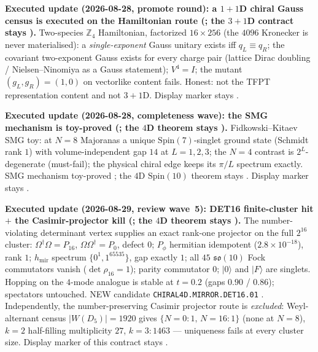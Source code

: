 \par\smallskip\noindent\textbf{Executed update (2026-08-28, promote round): a $1{+}1$D chiral
Gauss census is executed on the Hamiltonian route
(; the $3{+}1$D
contract stays \mO).}
Two-species $\mathbb Z_4$ Hamiltonian, factorized $16\times256$ (the $4096$ Kronecker is never
materialised): a \emph{single-exponent} Gauss unitary exists iff $q_L\equiv q_R$; the covariant
two-exponent Gauss exists for every charge pair (lattice Dirac doubling / Nielsen--Ninomiya as
a Gauss statement); $V^4=I$; the mutant $(g_L,g_R)=(1,0)$ on vectorlike content fails.
Honest: not the TFPT representation content and not $3{+}1$D.  Display marker stays \mO.

\par\smallskip\noindent\textbf{Executed update (2026-08-28, completeness wave): the SMG mechanism
is toy-proved
(; the $4$D theorem stays \mO).}
Fidkowski--Kitaev SMG toy: at $N=8$ Majoranas a unique $\mathrm{Spin}(7)$-singlet ground state
(Schmidt rank $1$) with volume-independent gap $14$ at $L=1,2,3$; the $N=4$ contrast is
$2^L$-degenerate (must-fail); the physical chiral edge keeps its $\pi/L$ spectrum exactly.
SMG mechanism toy-proved \mE; the $4$D $\mathrm{Spin}(10)$ theorem stays \mO.
Display marker stays \mO.

\par\smallskip\noindent\textbf{Executed update (2026-08-29, review wave~5): DET16 finite-cluster
hit $+$ the Casimir-projector kill
(; the $4$D theorem
stays \mO).}
The number-violating determinant vertex supplies an exact rank-one projector on the full
$2^{16}$ cluster: $\Omega^\dagger\Omega=P_{16}$, $\Omega\Omega^\dagger=P_0$, defect $0$;
$P_\phi$ hermitian idempotent ($2.8{\times}10^{-18}$), rank $1$; $h_{\mathrm{mir}}$ spectrum
$\{0^1,1^{65535}\}$, gap exactly $1$; all $45$ $\mathfrak{so}(10)$ Fock commutators vanish
($\det\rho_{16}=1$); parity commutator $0$; $\lvert0\rangle$ and $\lvert F\rangle$ are singlets.
Hopping on the $4$-mode analogue is stable at $t=0.2$ (gaps $0.90$ / $0.86$); spectators
untouched.  NEW candidate \texttt{CHIRAL4D.MIRROR.DET16.01} \mC.  Independently, the
number-preserving Casimir projector route is \emph{excluded}: Weyl-alternant census
$|W(D_5)|{=}1920$ gives $\{N{=}0{:}1,\,N{=}16{:}1\}$ (none at $N{=}8$), $k{=}2$ half-filling
multiplicity $27$, $k{=}3{:}1463$ --- uniqueness fails at every cluster size.  Display marker of
this contract stays \mO.

